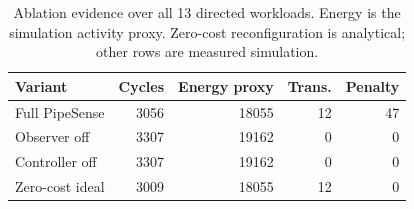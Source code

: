\begin{table}[t]
\caption{Ablation evidence over all 13 directed workloads. Energy is the simulation activity proxy. Zero-cost reconfiguration is analytical; other rows are measured simulation.}
\label{tab:ablation-evidence}
\centering\scriptsize
\begin{tabular}{lrrrr}
\toprule
Variant & Cycles & Energy proxy & Trans. & Penalty \\
\midrule
Full PipeSense & 3056 & 18055 & 12 & 47 \\
Observer off & 3307 & 19162 & 0 & 0 \\
Controller off & 3307 & 19162 & 0 & 0 \\
Zero-cost ideal & 3009 & 18055 & 12 & 0 \\
\bottomrule
\end{tabular}
\end{table}
